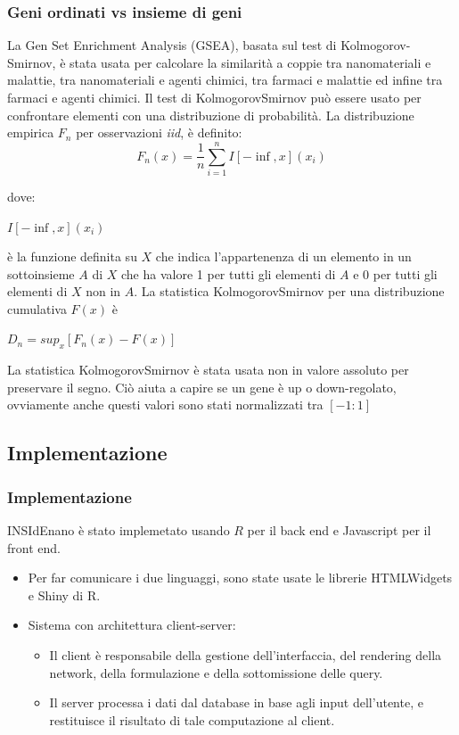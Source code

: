 \documentclass{beamer}
\begin{document}
\begin{frame}
\frametitle{Geni ordinati vs insieme di geni}
La Gen Set Enrichment Analysis (GSEA), basata sul test di Kolmogorov-Smirnov, è stata usata per calcolare la similarità a coppie tra nanomateriali e malattie, tra nanomateriali e agenti chimici, tra farmaci e malattie ed infine tra farmaci e agenti chimici. Il test di KolmogorovSmirnov può essere usato per confrontare elementi con una distribuzione di probabilità. La distribuzione empirica $F_n$ per osservazioni \textit{iid}, è definito:
\begin{equation}
F_n(x) = \frac{1}{n} \sum\limits_{i=1}^n I[-\inf,x](x_i)
\end{equation}
\end{frame}

\begin{frame}
dove:
\begin{center}
$I[-\inf,x](x_i)$
\end{center}
è la funzione definita su $X$ che indica l'appartenenza di un elemento in un sottoinsieme $A$ di $X$ che ha valore 1 per tutti gli elementi di $A$ e 0 per tutti gli elementi di $X$ non in $A$. La statistica KolmogorovSmirnov per una distribuzione cumulativa $F(x)$ è 
\begin{center}
$D_n = sup_x[F_n(x)- F(x)]$
\end{center}
La statistica KolmogorovSmirnov è stata usata non in valore assoluto per preservare il segno. Ciò aiuta a capire se un gene è up o down-regolato, ovviamente anche questi valori sono stati normalizzati tra $[-1:1]$
\end{frame}

\subsection{Implementazione}
\begin{frame}
\frametitle{Implementazione}
INSIdEnano è stato implemetato usando $R$ per il back end e Javascript per il front end.
\begin{itemize}
 \item Per far comunicare i due linguaggi, sono state usate le librerie HTMLWidgets e Shiny di R. 
 \item Sistema con architettura client-server: 
 \begin{itemize}
 \item Il client è responsabile della gestione dell'interfaccia, del rendering della network, della formulazione e della sottomissione delle query. 
 \item Il server processa i dati dal database in base agli input dell'utente, e restituisce il risultato di tale computazione al client.
\end{itemize}
\end{itemize}  
\end{frame}
\end{document}
